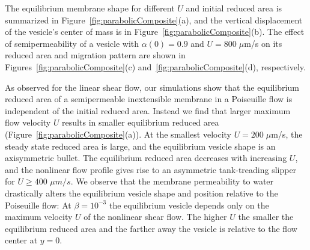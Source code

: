 \documentclass[prb,preprint,showpacs,preprintnumbers,amsmath,amssymb,longbibliography]{revtex4-1}
\begin{document}
The equilibrium membrane shape for different $U$ and initial reduced
area is summarized in Figure~\ref{fig:parabolicComposite}(a), and the
vertical displacement of the vesicle's center of mass is in
Figure~\ref{fig:parabolicComposite}(b). The effect of semipermeability
of a vesicle with $\alpha(0) = 0.9$ and $U=800\; \mu$m/s on its reduced
area and migration pattern are shown in
Figures~\ref{fig:parabolicComposite}(c)
and~\ref{fig:parabolicComposite}(d), respectively. 

As observed for the linear shear flow, our simulations show that the
equilibrium reduced area of a semipermeable inextensible membrane in a
Poiseuille flow is independent of the initial reduced area. Instead we
find that larger maximum flow velocity $U$ results in smaller
equilibrium reduced area (Figure~\ref{fig:parabolicComposite}(a)). At
the smallest velocity $U= 200\; \mu$m/s, the steady state reduced area
is large, and the equilibrium vesicle shape is an axisymmetric bullet.
The equilibrium reduced area decreases with increasing $U$, and the
nonlinear flow profile gives rise to an asymmetric tank-treading slipper
for $U\ge 400$ $\mu m/s$. We observe that the membrane permeability to
water drastically alters the equilibrium vesicle shape and position
relative to the Poiseuille flow: At $\beta=10^{-3}$ the equilibrium
vesicle depends only on the maximum velocity $U$ of the nonlinear shear
flow. The higher $U$ the smaller the equilibrium reduced area and the
farther away the vesicle is relative to the flow center at $y=0$.

\end{document}
